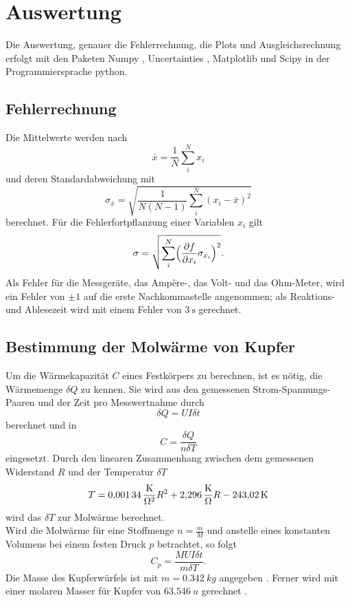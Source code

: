\section{Auswertung}
Die Auswertung, genauer die Fehlerrechnung, die Plots und Ausgleichsrechnung erfolgt mit den Paketen
Numpy \cite{numpy}, Uncertainties \cite{uncertainties}, Matplotlib \cite{matplotlib} und Scipy \cite{scipy} in der Programmiersprache python.
\subsection{Fehlerrechnung}
Die Mittelwerte werden nach
\begin{equation}
	\bar{x}=\frac{1}{N}\sum_{i}^N x_i
\end{equation}
und deren Standardabweichung mit
\begin{equation}
	\sigma_{\bar{x}} = \sqrt{\frac{1}{N(N-1)} \sum_{i}^N (x_i-\bar{x})^2}
\end{equation}
berechnet.
Für die Fehlerfortpflanzung einer Variablen $x_i$ gilt
\begin{equation}
	\sigma = \sqrt{\sum_{i}^N \Bigl(\frac{\partial f}{\partial x_i} \sigma_{x_i}\Bigr)^2}.
	\label{eq:gaussfehler}
\end{equation}
Als Fehler für die Messgeräte, das Amp\`{e}re-, das Volt- und das Ohm-Meter, wird ein Fehler von $\pm 1$ auf die erste Nachkommastelle angenommen;
als Reaktions- und Ablesezeit wird mit einem Fehler von $\SI{3}{\second}$ gerechnet.
\clearpage
\subsection{Bestimmung der Molwärme von Kupfer}

Um die Wärmekapazität $C$ eines Festkörpers zu berechnen, ist es nötig, die Wärmemenge $\delta Q$ zu kennen.
Sie wird aus den gemessenen Strom-Spannungs-Paaren und der Zeit pro Messwertnahme durch
\begin{equation}
  \delta Q = U I \delta t
\end{equation}
berechnet und in
\begin{equation}
  C=\frac{\delta Q}{n\delta T}
\end{equation}
eingesetzt.
Durch den linearen Zusammenhang zwischen dem gemessenen Widerstand $R$ und der Temperatur $\delta T$
\begin{equation}
  T=\SI{0,00134}{\frac{K}{\ohm^2}} R^2 + \SI{2,296}{\frac{K}{\ohm}} R - \SI{243,02}{K}
\end{equation}
wird das $\delta T$ zur Molwärme berechnet.\\
Wird die Molwärme für eine Stoffmenge $n= \frac{m}{M}$ und anstelle eines konstanten Volumens bei einem festen Druck $p$ betrachtet,
so folgt
\begin{equation}
  C_p=\frac{MUI\delta t}{m\delta T}.
\end{equation}
Die Masse des Kupferwürfels ist mit $m=\SI{0,342}{kg}$ angegeben \cite{anleitung}.
Ferner wird mit einer molaren Masser für Kupfer von $\SI{63,546}{u}$ gerechnet \cite{molaremassecu}.\\

